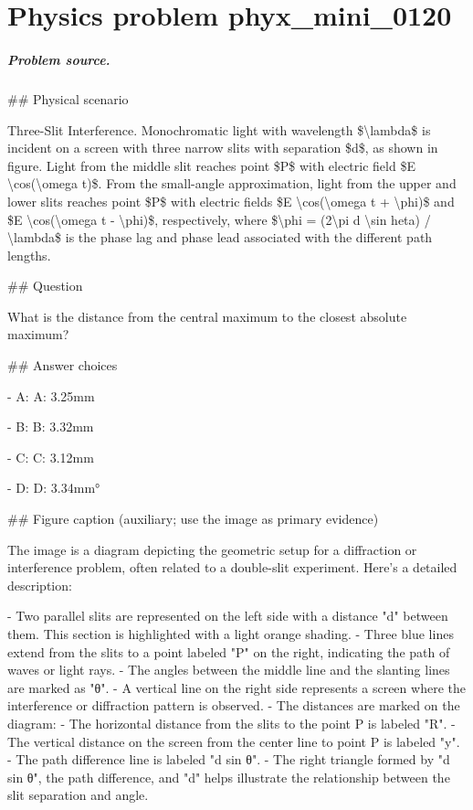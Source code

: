 
\chapter{Physics problem phyx\_mini\_0120}
\label{ch:PhyXMiniProblems_problem_phyx_mini_0120}

\paragraph{Problem source.}
\#\# Physical scenario

Three-Slit Interference. Monochromatic light with wavelength \$\textbackslash{}lambda\$ is incident on a screen with three narrow slits with separation \$d\$, as shown in figure. Light from the middle slit reaches point \$P\$ with electric field \$E \textbackslash{}cos(\textbackslash{}omega t)\$. From the small-angle approximation, light from the upper and lower slits reaches point \$P\$ with electric fields \$E \textbackslash{}cos(\textbackslash{}omega t + \textbackslash{}phi)\$ and \$E \textbackslash{}cos(\textbackslash{}omega t - \textbackslash{}phi)\$, respectively, where \$\textbackslash{}phi = (2\textbackslash{}pi d \textbackslash{}sin 	heta) / \textbackslash{}lambda\$ is the phase lag and phase lead associated with the different path lengths.

\#\# Question

What is the distance from the central maximum to the closest absolute maximum?

\#\# Answer choices

- A: A: 3.25mm

- B: B: 3.32mm

- C: C: 3.12mm

- D: D: 3.34mm°

\#\# Figure caption (auxiliary; use the image as primary evidence)

The image is a diagram depicting the geometric setup for a diffraction or interference problem, often related to a double-slit experiment. Here's a detailed description:

- Two parallel slits are represented on the left side with a distance "d" between them. This section is highlighted with a light orange shading.
- Three blue lines extend from the slits to a point labeled "P" on the right, indicating the path of waves or light rays. 
- The angles between the middle line and the slanting lines are marked as "θ".
- A vertical line on the right side represents a screen where the interference or diffraction pattern is observed.
- The distances are marked on the diagram: 
  - The horizontal distance from the slits to the point P is labeled "R".
  - The vertical distance on the screen from the center line to point P is labeled "y".
  - The path difference line is labeled "d sin θ".
- The right triangle formed by "d sin θ", the path difference, and "d" helps illustrate the relationship between the slit separation and angle.

